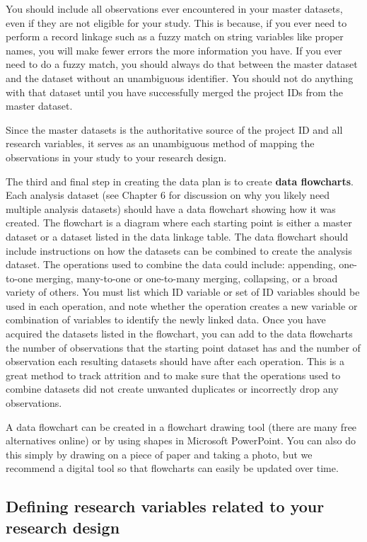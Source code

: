 You should include all observations ever encountered
in your master datasets,
even if they are not eligible for your study.
This is because, if you ever need to perform a record linkage such as a fuzzy match
on string variables like proper names,
you will make fewer errors the more information you have.
If you ever need to do a fuzzy match,
you should always do that between the master dataset
and the dataset without an unambiguous identifier.
You should not do anything with that dataset until
you have successfully merged
the project IDs from the master dataset.

Since the master datasets is the authoritative source
of the project ID and all research variables,
it serves as an unambiguous method of mapping
the observations in your study to your research design.

The third and final step in creating the data plan is to create \textbf{data flowcharts}.
Each analysis dataset
(see Chapter 6 for discussion on why you likely need multiple analysis datasets)
should have a data flowchart showing how it was created.
The flowchart is a diagram
where each starting point is either a master dataset
or a dataset listed in the data linkage table.
The data flowchart should include instructions on how
the datasets can be combined to create the analysis dataset.
The operations used to combine the data could include:
appending, one-to-one merging,
many-to-one or one-to-many merging, collapsing, or a broad variety of others.
You must list which ID variable or set of ID variables
should be used in each operation,
and note whether the operation creates a new variable or combination of variables
to identify the newly linked data.
Once you have acquired the datasets listed in the flowchart,
you can add to the data flowcharts the number of observations that
the starting point dataset has
and the number of observation each resulting datasets
should have after each operation.
This is a great method to track attrition and to make sure that
the operations used to combine datasets did not create unwanted duplicates
or incorrectly drop any observations.

A data flowchart can be created in a flowchart drawing tool
(there are many free alternatives online) or
by using shapes in Microsoft PowerPoint.
You can also do this simply by drawing on a piece of paper and taking a photo,
but we recommend a digital tool
so that flowcharts can easily be updated over time.

\subsection{Defining research variables related to your research design}

